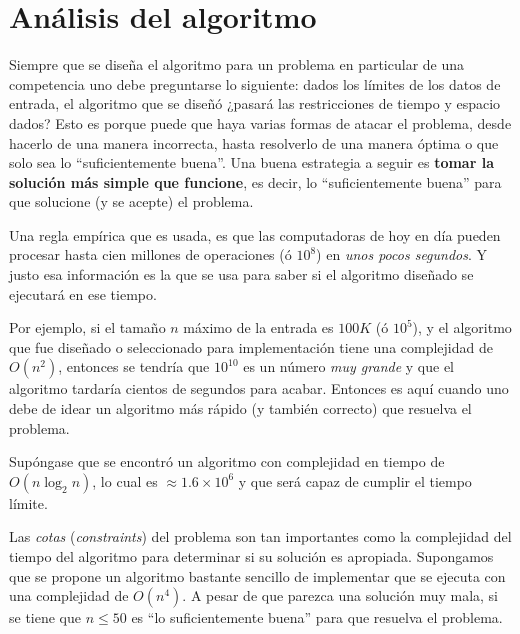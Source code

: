 
\section{Análisis del algoritmo}
Siempre que se diseña el algoritmo para un problema en particular de una 
competencia uno debe preguntarse lo siguiente: dados los límites de los datos de 
entrada, el algoritmo que se diseñó
¿pasará las restricciones de tiempo y espacio dados?
Esto es porque puede que haya varias formas de atacar el problema, desde hacerlo 
de una manera incorrecta, hasta resolverlo de una manera óptima o que solo sea 
lo ``suficientemente buena''.
Una buena estrategia a seguir es \textbf{tomar la solución más simple que 
funcione}, es decir, lo ``suficientemente buena'' para que solucione (y se 
acepte) el problema.

Una regla empírica que es usada, es que las computadoras de hoy en día pueden 
procesar hasta cien millones de operaciones (ó $10^8$) en \textit{unos pocos 
segundos}. Y justo esa información es la que se usa para saber si el algoritmo 
diseñado se ejecutará en ese tiempo.

Por ejemplo, si el tamaño $n$ máximo de la entrada es $100K$ (ó $10^5$), y el 
algoritmo que fue diseñado o seleccionado para implementación tiene una 
complejidad de $O(n^2)$, entonces se tendría que $10^{10}$ es un número
\emph{muy grande} y que el algoritmo tardaría cientos de segundos para acabar. 
Entonces es aquí cuando uno debe de idear un algoritmo más rápido (y también 
correcto) que resuelva el problema.

Supóngase que se encontró un algoritmo con complejidad en tiempo de 
$O(n \log_2 n)$, lo cual es $\approx 1.6 \times 10^6$ y %
que será capaz de %
cumplir el tiempo límite.

Las \emph{cotas} (\emph{constraints}) del problema son tan importantes como la 
complejidad del tiempo del algoritmo para determinar si su solución es 
apropiada. Supongamos que se propone un algoritmo bastante sencillo de 
implementar que se ejecuta con una complejidad de $O(n^4)$. A pesar
de que parezca una solución muy mala, si se tiene que $n \leq 50$ es ``lo 
suficientemente buena'' para que resuelva el problema.

